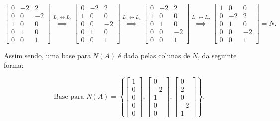 \begin{Example}
	$$
	\begin{bmatrix}
		0 & -2 & 2 \\
		0 & 0 & -2 \\
		1 & 0 & 0 \\
		0 & 1 & 0 \\
		0 & 0 & 1
	\end{bmatrix}\overset{L_2\leftrightarrow L_3}{\implies}\begin{bmatrix}
		0 & -2 & 2 \\
		1 & 0 & 0 \\
		0 & 0 & -2 \\
		0 & 1 & 0 \\
		0 & 0 & 1
	\end{bmatrix}\overset{L_3\leftrightarrow L_4}{\implies}\begin{bmatrix}
		0 & -2 & 2 \\
		1 & 0 & 0 \\
		0 & 1 & 0 \\
		0 & 0 & -2 \\
		0 & 0 & 1
	\end{bmatrix}\overset{L_1\leftrightarrow L_2}{\implies}\begin{bmatrix}
		1 & 0 & 0 \\
		0 & -2 & 2 \\
		0 & 1 & 0 \\
		0 & 0 & -2 \\
		0 & 0 & 1
	\end{bmatrix} = N.
	$$
	
	Assim sendo, uma base para $N(A)$ é dada pelas colunas de $N$, da seguinte forma:
	
	$$
	\text{Base para $N(A)$} = \left\{\begin{bmatrix}
		1 \\
		0 \\
		0 \\
		0 \\
		0
	\end{bmatrix}, \begin{bmatrix}
		0 \\
		-2 \\
		1 \\
		0 \\
		0
	\end{bmatrix}, \begin{bmatrix}
		0 \\
		2 \\
		0 \\
		-2 \\
		1
	\end{bmatrix}\right\}.
	$$
	

\end{Example}
